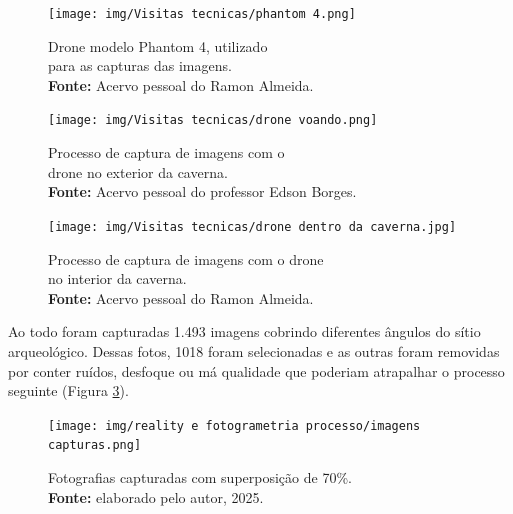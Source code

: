 \begin{figure}[H]
    \centering
    \begin{minipage}{0.45\textwidth} %
        \centering
    \texttt{[image: img/Visitas tecnicas/phantom 4.png]}
    \caption{ Drone modelo Phantom 4, utilizado \\ para as capturas das imagens.\\
        \textbf{Fonte:} Acervo pessoal do Ramon Almeida.}
    \label{fig:phantom 4}   
    \end{minipage}
    \hspace{1cm} %
    \begin{minipage}{0.45\textwidth} %
        \centering
        \texttt{[image: img/Visitas tecnicas/drone voando.png]}
        \caption{Processo de captura de imagens com o \\ drone no exterior da caverna.\\
            \textbf{Fonte:} Acervo pessoal do professor Edson Borges.}
        \label{fig:drone voando}
    \end{minipage}
\end{figure}

\begin{figure}[H]
    \centering
        \texttt{[image: img/Visitas tecnicas/drone dentro da caverna.jpg]}
        \caption{Processo de captura de imagens com o drone \\
        no interior da caverna. \\
            \textbf{Fonte:} Acervo pessoal do Ramon Almeida.}
        \label{fig:drone dentro da caverna}
\end{figure}

 Ao todo foram capturadas 1.493 imagens cobrindo diferentes ângulos do sítio arqueológico. Dessas fotos, 1018 foram selecionadas e as outras foram removidas por conter ruídos, desfoque ou má qualidade que poderiam atrapalhar o processo seguinte (Figura \ref{fig:fotos tiradas}).

\begin{figure}[H]
    \centering
    \texttt{[image: img/reality e fotogrametria processo/imagens capturas.png]}
    \caption{Fotografias capturadas com superposição de 70\%.\\
        \textbf{Fonte:} elaborado pelo autor, 2025.}
    \label{fig:fotos tiradas}   
\end{figure}

